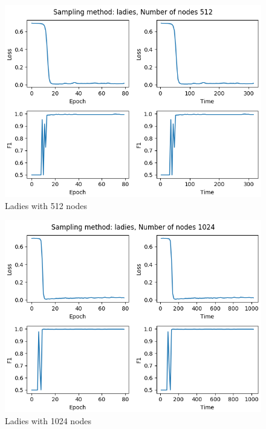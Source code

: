 \begin{figure}[H]
    \centering
    \includegraphics[scale=0.8, ]{assets/plots/ladies_512.png}
    \caption{Ladies with 512 nodes}
\end{figure}

\begin{figure}[H]
    \centering
    \includegraphics[scale=0.8, ]{assets/plots/ladies_1024.png}
    \caption{Ladies with 1024 nodes}
\end{figure}

